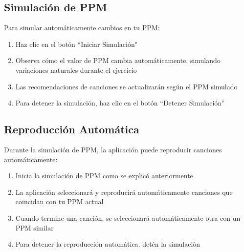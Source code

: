 \documentclass[a4paper,12pt]{article}
\begin{document}
\subsection{Simulación de PPM}
Para simular automáticamente cambios en tu PPM:
\begin{enumerate}
    \item Haz clic en el botón ``Iniciar Simulación"
    \item Observa cómo el valor de PPM cambia automáticamente, simulando variaciones naturales durante el ejercicio
    \item Las recomendaciones de canciones se actualizarán según el PPM simulado
    \item Para detener la simulación, haz clic en el botón ``Detener Simulación"
\end{enumerate}




\subsection{Reproducción Automática}
Durante la simulación de PPM, la aplicación puede reproducir canciones automáticamente:
\begin{enumerate}
    \item Inicia la simulación de PPM como se explicó anteriormente
    \item La aplicación seleccionará y reproducirá automáticamente canciones que coincidan con tu PPM actual
    \item Cuando termine una canción, se seleccionará automáticamente otra con un PPM similar
    \item Para detener la reproducción automática, detén la simulación
\end{enumerate}
\end{document}
